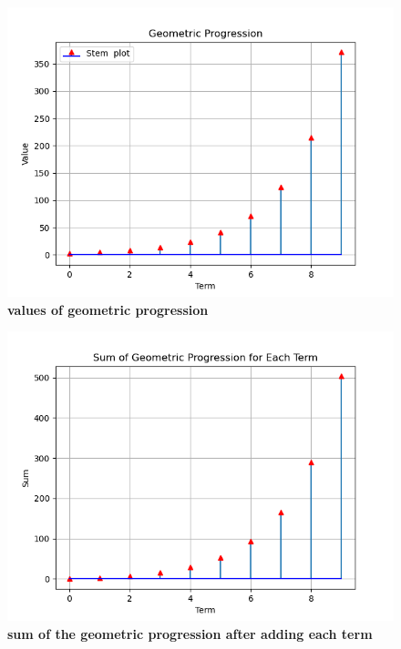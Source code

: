 \documentclass[a4,12pt,onecolumn]{IEEEtran}
\begin{document}
\begin{figure}[ht!]
\includegraphics[width=\columnwidth]{fig/fig2.png}
\caption{\textbf{\large{values of geometric progression}}}
\end{figure}
\begin{figure}[ht!]
\includegraphics[width=\columnwidth]{fig/fig1.png}
\caption{\textbf{\large{sum of the geometric progression after adding each term}}}
\end{figure}
\end{document}
